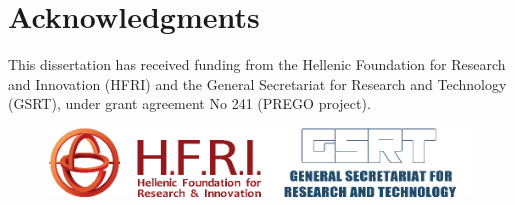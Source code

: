 % 
% 

\chapter*{Acknowledgments}
\label{acknowledge}


This dissertation has received funding from the Hellenic Foundation 
for Research and Innovation (HFRI) and the General Secretariat for Research 
and Technology (GSRT), under grant agreement No 241 (PREGO project).

\bigskip\bigskip

\begin{figure}[!h]
   \centering
   \begin{minipage}{\textwidth}
     \centering
     \includegraphics[width=.75\textwidth]{figures/hfri_gsrt.png}
   \end{minipage}
   \label{fig:funding_logos}
\end{figure}
   


